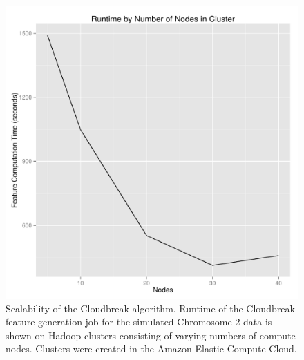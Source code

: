 \documentclass[11pt]{article}
\begin{document}
\begin{figure}
\centering
\includegraphics[width=1\textwidth]{runtimeByNodes.pdf}
\caption{Scalability of the Cloudbreak algorithm. Runtime of the Cloudbreak feature generation job for the simulated Chromosome 2 data is shown on Hadoop clusters consisting of varying numbers of compute nodes. Clusters were created in the Amazon Elastic Compute Cloud.}
\label{scalability}
\end{figure}

\clearpage
\end{document}
